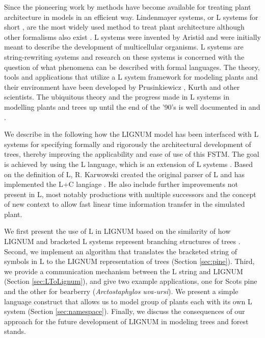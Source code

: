 Since  the pioneering  work  by \citet{honda:71}  methods have  become
available for  treating plant architecture  in models in  an efficient
way.  Lindenmayer  systems, or L systems for  short \citep{pp:89}, are
the most widely used method to treat plant architecture although other
formalisms    also   exist    \citep[e.g.][]{dereffye:97,   godin:99}.
L systems    were   invented    by    Aristid   \citet{lindenmayer:68,
lindenmayer:71} and  were initially meant to  describe the development
of  multicellular organisms.  L  systems are  string-rewriting systems
and research on  these systems is concerned with  the question of what
phenomena can  be described with formal languages.   The theory, tools
and applications that utilize a L system framework for modeling plants
and   their   environment  have   been   developed  by   Prusinkiewicz
\citep{pp:89,pp:92}, Kurth \citep{kurth:94} and other scientists.  The
ubiquitous  theory and  the progress  made in  L systems  in modelling
plants and trees  up until the end of the '90's  is well documented in
\citet{pp:90,pp:99} and \citet{kurth:99}.

We describe in the following  how the LIGNUM model has been interfaced
with   L  systems   for   specifying  formally   and  rigorously   the
architectural   development   of    trees,   thereby   improving   the
applicability and ease  of use of this FSTM.  The  goal is achieved by
using   the  L   language,  which   is  an   extension   of  L systems
\citep{pp:99a}.  Based  on the definition of L,  R.  Karwowski created
the  original  parser  of  L  and has  implemented  the  L+C  langiage
\citep{karwowski:02}. He also include further improvements not present
in  L,  most notably  productions  with  multiple  successors and  the
concept of new context  \citep{karwowski:03} to allow fast linear time
information transfer in the simulated plant.

We first present the use of L in LIGNUM based on the similarity of how
LIGNUM and bracketed L systems represent branching structures of trees
\citep{perttunen:96, perttunen:01}.  Second, we implement an algorithm
that translates  the bracketed  string of symbols  in L to  the LIGNUM
representation of trees (Section \ref{sec:pine}).  Third, we provide a
communication  mechanism  between the  L  string  and LIGNUM  (Section
\ref{sec:LToLignum}), and give two example applications, one for Scots
pine and  the other for  bearberry (\textit{Arctostaphylos uva-ursi}).
We present a  simple language construct that allows  us to model group
of plants  each with its  own L system  (Section \ref{sec:namespace}).
Finally, we  discuss the consequences  of our approach for  the future
development of LIGNUM in modeling trees and forest stands.

